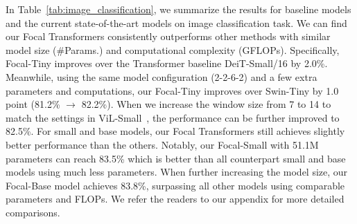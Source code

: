 \documentclass{article}
\begin{document}
In Table~\ref{tab:image_classification}, we summarize the results for baseline models and the current state-of-the-art models on image classification task. We can find our Focal Transformers consistently outperforms other methods with similar model size (\#Params.) and computational complexity (GFLOPs). Specifically, Focal-Tiny improves over the Transformer baseline DeiT-Small/16 by 2.0\%. Meanwhile, using the same model configuration (2-2-6-2) and a few extra parameters and computations, our Focal-Tiny improves over Swin-Tiny by 1.0 point (81.2\% $\rightarrow$ 82.2\%). When we increase the window size from 7 to 14 to match the settings in ViL-Small~\cite{zhang2021multi}, the performance can be further improved to 82.5\%. For small and base models, our Focal Transformers still achieves slightly better performance than the others. Notably, our Focal-Small with 51.1M parameters can reach 83.5\% which is better than all counterpart small and base models using much less parameters. When further increasing the model size, our Focal-Base model achieves 83.8\%, surpassing all other models using comparable parameters and FLOPs. We refer the readers to our appendix for more detailed comparisons.
\end{document}
